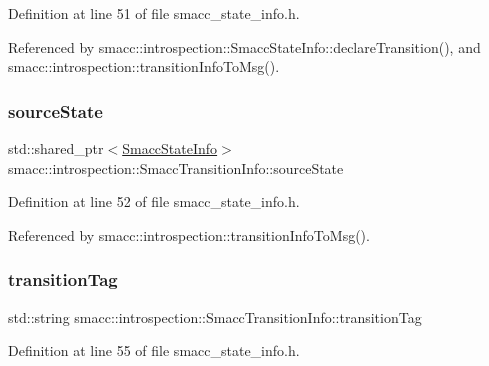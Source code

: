 Definition at line 51 of file smacc\+\_\+state\+\_\+info.\+h.



Referenced by smacc\+::introspection\+::\+Smacc\+State\+Info\+::declare\+Transition(), and smacc\+::introspection\+::transition\+Info\+To\+Msg().

\mbox{\label{structsmacc_1_1introspection_1_1SmaccTransitionInfo_aa44f16d098eb91ed222008fe0abf1275}} 
\subsubsection{\texorpdfstring{source\+State}{sourceState}}
{\footnotesize\ttfamily std\+::shared\+\_\+ptr$<$\hyperlink{classsmacc_1_1introspection_1_1SmaccStateInfo}{Smacc\+State\+Info}$>$ smacc\+::introspection\+::\+Smacc\+Transition\+Info\+::source\+State}



Definition at line 52 of file smacc\+\_\+state\+\_\+info.\+h.



Referenced by smacc\+::introspection\+::transition\+Info\+To\+Msg().

\mbox{\label{structsmacc_1_1introspection_1_1SmaccTransitionInfo_aece8c6af9a682232a435ca1d92b953bd}} 
\subsubsection{\texorpdfstring{transition\+Tag}{transitionTag}}
{\footnotesize\ttfamily std\+::string smacc\+::introspection\+::\+Smacc\+Transition\+Info\+::transition\+Tag}



Definition at line 55 of file smacc\+\_\+state\+\_\+info.\+h.



